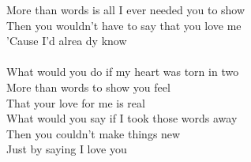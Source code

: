 More than words is all I ever needed you to show \\
Then you wouldn't have to say that you love me \\
'Cause I'd alrea dy know\\
\\
What would you do if my heart was torn in two \\
More than words to show you feel \\
That your love for me is real \\
What would you say if I took those words away \\
Then you couldn't make things new \\
Just by saying I love you\\